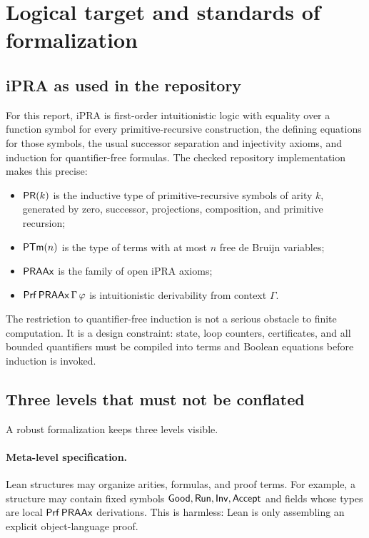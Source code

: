 \section{Logical target and standards of formalization}

\subsection{iPRA as used in the repository}

For this report, iPRA is first-order intuitionistic logic with equality over a
function symbol for every primitive-recursive construction, the defining
equations for those symbols, the usual successor separation and injectivity
axioms, and induction for quantifier-free formulas.  The checked repository
implementation makes this precise:
\begin{itemize}
\item \(\mathsf{PR}(k)\) is the inductive type of primitive-recursive symbols of arity
\(k\), generated by zero, successor, projections, composition, and primitive
recursion;
\item \(\mathsf{PTm}(n)\) is the type of terms with at most \(n\) free de Bruijn
variables;
\item \(\mathsf{PRAAx}\) is the family of open iPRA axioms;
\item \(\mathsf{Prf}\,\mathsf{PRAAx}\,\Gamma\,\varphi\) is intuitionistic derivability from
context \(\Gamma\).
\end{itemize}

The restriction to quantifier-free induction is not a serious obstacle to
finite computation.  It is a design constraint: state, loop counters,
certificates, and all bounded quantifiers must be compiled into terms and
Boolean equations before induction is invoked.

\subsection{Three levels that must not be conflated}

A robust formalization keeps three levels visible.

\paragraph{Meta-level specification.}
Lean structures may organize arities, formulas, and proof terms.  For example,
a structure may contain fixed symbols \(\mathsf{Good},\mathsf{Run},\mathsf{Inv},\mathsf{Accept}\) and fields
whose types are local \(\mathsf{Prf}\,\mathsf{PRAAx}\) derivations.  This is harmless: Lean is
only assembling an explicit object-language proof.

